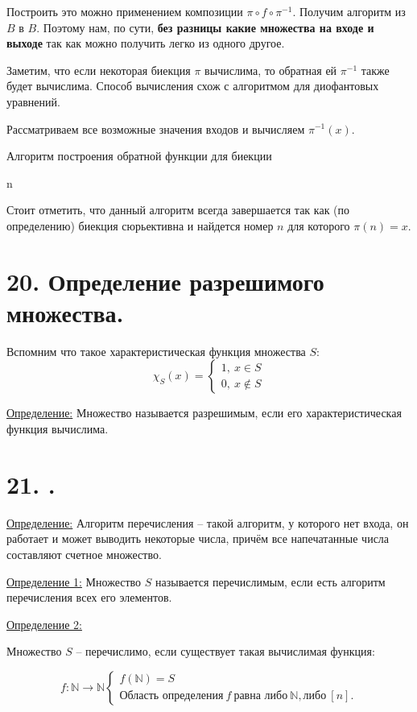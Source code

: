 \documentclass[a4paper, 12pt]{article}
\newcommand{\definition}{\underline{Определение:} }
\newcommand{\definitionone}{\underline{Определение 1:} }
\newcommand{\definitiontwo}{\underline{Определение 2:} }
\newcommand{\N}{\mathbb{N}}
\begin{document}
Построить это можно применением композиции  $\pi \circ f \circ \pi^{-1}$. Получим алгоритм из $B$ в $B$. 
Поэтому нам, по сути, \textbf{без разницы какие множества на входе
и выходе} так как можно получить легко из одного другое.

Заметим, что если некоторая биекция $\pi$ вычислима, то обратная ей $\pi^{-1}$ также будет вычислима. Способ вычисления схож с алгоритмом для диофантовых уравнений.

Рассматриваем все возможные значения входов и вычисляем $\pi^{-1}(x)$.
\begin{algorithm}
\caption{Алгоритм построения обратной функции для биекции}
\begin{algorithmic}[1]
            \State \Return n
        \EndIf
    \EndFor
\EndFunction
\end{algorithmic}
\end{algorithm}

Стоит отметить, что данный алгоритм всегда завершается так как
(по определению) биекция сюрьективна и найдется номер $n$ для
которого $\pi(n) = x$.

\section*{20. Определение разрешимого множества.}

Вспомним что такое характеристическая функция множества $S$:
\[
\chi_S(x) = \begin{cases}
    1,\ x \in S \\
    0,\ x \notin S
\end{cases}
\]

\definition{Множество называется разрешимым, если его
характеристическая функция вычислима.}

\section*{21.  .}

\definition{Алгоритм перечисления -- такой алгоритм, у которого нет входа, он работает и может выводить некоторые числа, причём все напечатанные числа составляют счетное множество.}

\definitionone{Множество $S$ называется перечислимым, если есть алгоритм перечисления всех его элементов.}

\definitiontwo{Множество $S$ -- перечислимо, если существует такая вычислимая функция:

\[
    f: \N \to \N
    \begin{cases}
        f(\N) = S \\
        \text{Область определения} \ f \ \text{равна либо} \ \N, \text{либо} \ [n].
    \end{cases}
\]

}
\end{document}

